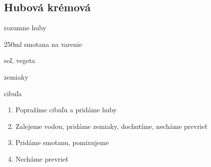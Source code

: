 \setcounter{step}{0}
\subsection{Hubová krémová}

\begin{ingredient}
\def\portions{4}%

\begin{main}
	\item rozumne huby
	\item 250ml smotana na varenie
	\item soľ, vegeta
	\item zemiaky
	\item cibuľa
\end{main}
\end{ingredient}
\begin{recipe}

\begin{enumerate}


\item{Popražíme cibuľu a pridáme huby}
\item{Zalejeme vodou, pridáme zemiaky, dochutíme, necháme prevrieť}
\item{Pridáme smotanu, pomixujeme}
\item{Necháme prevrieť}

\end{enumerate}
\end{recipe}

\begin{notes}

\end{notes}
\clearpage	
